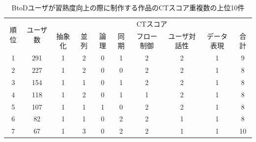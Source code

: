 \documentclass[11pt,dvipdfmx]{jreport}
\begin{document}
\begin{table}[]
\caption{BtoDユーザが習熟度向上の際に制作する作品のCTスコア重複数の上位10件}
  \label{tab:ranking-btod}
  \vspace{2mm}
  \centering
\begin{tabular}{c|c|cccccccc}
\hline
\multirow{2}{*}{順位} & \multirow{2}{*}{ユーザ数} & \multicolumn{8}{c}{CTスコア}                                                                                               \\ \cline{3-10} 
                    &                      & \multicolumn{1}{c|}{抽象化}  & \multicolumn{1}{c|}{並列} & \multicolumn{1}{c|}{論理} & \multicolumn{1}{c|}{同期} & \multicolumn{1}{c|}{フロー制御} & \multicolumn{1}{c|}{ユーザ対話性} & \multicolumn{1}{c|}{データ表現} & 合計 \\ \hline
                    \hline
1                   & 291                  & \multicolumn{1}{c|}{1} & \multicolumn{1}{c|}{2} & \multicolumn{1}{c|}{0} & \multicolumn{1}{c|}{1} & \multicolumn{1}{c|}{2} & \multicolumn{1}{c|}{2} & \multicolumn{1}{c|}{1} & 9  \\ \hline
2                   & 227                  & \multicolumn{1}{c|}{1} & \multicolumn{1}{c|}{2} & \multicolumn{1}{c|}{0} & \multicolumn{1}{c|}{0} & \multicolumn{1}{c|}{2} & \multicolumn{1}{c|}{2} & \multicolumn{1}{c|}{1} & 8  \\ \hline
3                   & 154                  & \multicolumn{1}{c|}{1} & \multicolumn{1}{c|}{1} & \multicolumn{1}{c|}{0} & \multicolumn{1}{c|}{1} & \multicolumn{1}{c|}{2} & \multicolumn{1}{c|}{2} & \multicolumn{1}{c|}{1} & 8  \\ \hline
4                   & 118                  & \multicolumn{1}{c|}{1} & \multicolumn{1}{c|}{2} & \multicolumn{1}{c|}{0} & \multicolumn{1}{c|}{1} & \multicolumn{1}{c|}{1} & \multicolumn{1}{c|}{2} & \multicolumn{1}{c|}{1} & 8  \\ \hline
5                   & 107                  & \multicolumn{1}{c|}{1} & \multicolumn{1}{c|}{1} & \multicolumn{1}{c|}{1} & \multicolumn{1}{c|}{0} & \multicolumn{1}{c|}{2} & \multicolumn{1}{c|}{2} & \multicolumn{1}{c|}{1} & 8  \\ \hline
6                   & 82                   & \multicolumn{1}{c|}{1} & \multicolumn{1}{c|}{1} & \multicolumn{1}{c|}{0} & \multicolumn{1}{c|}{2} & \multicolumn{1}{c|}{2} & \multicolumn{1}{c|}{1} & \multicolumn{1}{c|}{1} & 8  \\ \hline
7                   & 67                   & \multicolumn{1}{c|}{1} & \multicolumn{1}{c|}{3} & \multicolumn{1}{c|}{0} & \multicolumn{1}{c|}{2} & \multicolumn{1}{c|}{2} & \multicolumn{1}{c|}{1} & \multicolumn{1}{c|}{1} & 10 \\ \hline

\end{tabular}
\end{table}
\end{document}
